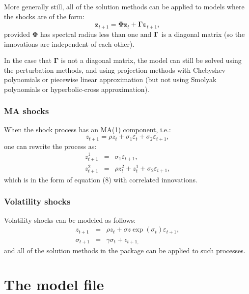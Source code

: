 \documentclass[notitlepage,11pt]{article}
\begin{document}
More generally still, all of the solution methods can be applied to models
where the shocks are of the form:%
\begin{equation}
\mathbf{z}_{t+1}=\mathbf{\Phi z}_{t}+\mathbf{\Gamma \varepsilon }_{t+1},
\label{8}
\end{equation}%
provided $\mathbf{\Phi }$ has spectral radius less than one and $\mathbf{%
\Gamma }$ is a diagonal matrix (so the innovations are independent of each
other).

In the case that $\mathbf{\Gamma }$ is not a diagonal matrix, the model can
still be solved using the perturbation methods, and using projection methods
with Chebyshev polynomials or piecewise linear approximation (but not using
Smolyak polynomials or hyperbolic-cross approximation).

\subsubsection{MA shocks}

When the shock process has an MA(1) component, i.e.:%
\begin{equation*}
z_{t+1}=\rho z_{t}+\sigma _{1}\varepsilon _{t}+\sigma _{2}\varepsilon _{t+1},
\end{equation*}%
one can rewrite the process as:%
\begin{eqnarray*}
z_{t+1}^{1} &=&\sigma _{1}\varepsilon _{t+1}, \\
z_{t+1}^{2} &=&\rho z_{t}^{2}+z_{t}^{1}+\sigma _{2}\varepsilon _{t+1},
\end{eqnarray*}%
which is in the form of equation (8) with correlated innovations.

\subsubsection{Volatility shocks}

Volatility shocks can be modeled as follows:%
\begin{eqnarray*}
z_{t+1} &=&\rho z_{t}+\sigma z\exp (\sigma _{t})\varepsilon _{t+1}, \\
\sigma _{t+1} &=&\gamma \sigma _{t}+\epsilon _{t+1,}
\end{eqnarray*}%
and all of the solution methods in the package can be applied to such
processes. 

\section{The model file}
\end{document}
